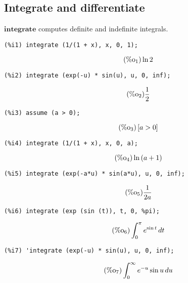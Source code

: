 \documentclass[12pt,leqno]{article}
\begin{document}
\subsection{Integrate and differentiate}

$\mathbf{integrate}$ computes definite and indefinite integrals.
\begin{verbatim}
(%i1) integrate (1/(1 + x), x, 0, 1);
\end{verbatim}
\begin{equation}
\tag{$\mathop{\mathrm{\%o}_{1}}$}\ln 2
\label{eq:doc-group1-code29-1-1}
\end{equation}
\begin{verbatim}
(%i2) integrate (exp(-u) * sin(u), u, 0, inf);
\end{verbatim}
\begin{equation}
\tag{$\mathop{\mathrm{\%o}_{2}}$}\frac{1}{2}
\label{eq:doc-group1-code29-2-1}
\end{equation}
\begin{verbatim}
(%i3) assume (a > 0);
\end{verbatim}
\begin{equation}
\tag{$\mathop{\mathrm{\%o}_{3}}$}\left[a > 0\right]
\label{eq:doc-group1-code29-3-1}
\end{equation}
\begin{verbatim}
(%i4) integrate (1/(1 + x), x, 0, a);
\end{verbatim}
\begin{equation}
\tag{$\mathop{\mathrm{\%o}_{4}}$}\ln \left(a+1\right)
\label{eq:doc-group1-code29-4-1}
\end{equation}
\begin{verbatim}
(%i5) integrate (exp(-a*u) * sin(a*u), u, 0, inf);
\end{verbatim}
\begin{equation}
\tag{$\mathop{\mathrm{\%o}_{5}}$}\frac{1}{2 a}
\label{eq:doc-group1-code29-5-1}
\end{equation}
\begin{verbatim}
(%i6) integrate (exp (sin (t)), t, 0, %pi);
\end{verbatim}
\begin{equation}
\tag{$\mathop{\mathrm{\%o}_{6}}$}\int_{0}^{\pi}{e}^{\sin t}\mathop{dt}
\label{eq:doc-group1-code29-6-1}
\end{equation}
\begin{verbatim}
(%i7) 'integrate (exp(-u) * sin(u), u, 0, inf);
\end{verbatim}
\begin{equation}
\tag{$\mathop{\mathrm{\%o}_{7}}$}\int_{0}^{\infty}{e}^{-u} \sin u\mathop{du}
\label{eq:doc-group1-code29-7-1}
\end{equation}
\end{document}

